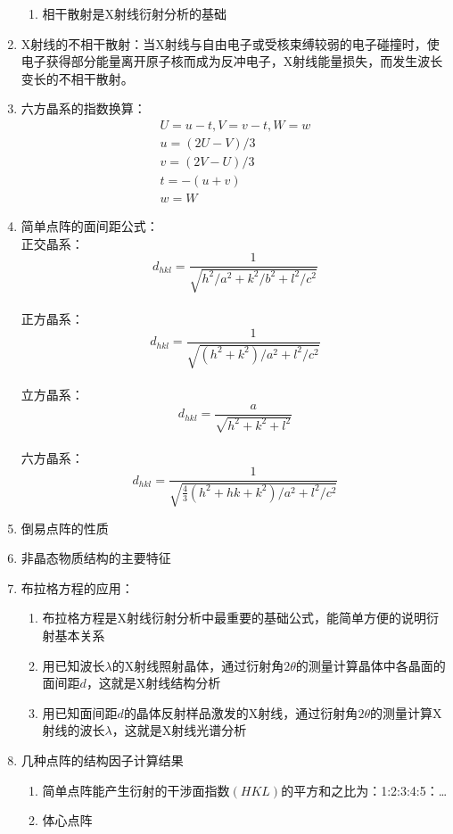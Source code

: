 \documentclass[12pt,a4paper]{article}
\begin{document}
\begin{enumerate}
\begin{enumerate}
            \item 相干散射是X射线衍射分析的基础
        \end{enumerate}
        \item X射线的不相干散射：当X射线与自由电子或受核束缚较弱的电子碰撞时，使电子获得部分能量离开原子核而成为反冲电子，X射线能量损失，而发生波长变长的不相干散射。
        \item 六方晶系的指数换算：$$\begin{array}{c}{U=u-t, V=v-t, W=w} \\ {u=(2 U-V) / 3} \\ {v=(2 V-U) / 3} \\ {t=-(u+v)} \\ {w=W}\end{array}$$
        \item 简单点阵的面间距公式：
        \\正交晶系：$$d_{h k l}=\frac{1}{\sqrt{h^{2} / a^{2}+k^{2} / b^{2}+l^{2} / c^{2}}}$$
        \\正方晶系：$$d_{h k l}=\frac{1}{\sqrt{\left(h^{2}+k^{2}\right) / a^{2}+l^{2} / c^{2}}}$$
        \\立方晶系：$$d_{h k l}=\frac{a}{\sqrt{h^{2}+k^{2}+l^{2}}}$$
        \\六方晶系：$$d_{h k l}=\frac{1}{\sqrt{\frac{4}{3}\left(h^{2}+h k+k^{2}\right) / a^{2}+l^{2} / c^{2}}}$$
        \item 倒易点阵的性质
        \item 非晶态物质结构的主要特征
        \item 布拉格方程的应用：
        \begin{enumerate}
            \item 布拉格方程是X射线衍射分析中最重要的基础公式，能简单方便的说明衍射基本关系
            \item 用已知波长$\lambda$的X射线照射晶体，通过衍射角$2\theta$的测量计算晶体中各晶面的面间距$d$，这就是X射线结构分析
            \item 用已知面间距$d$的晶体反射样品激发的X射线，通过衍射角$2\theta$的测量计算X射线的波长$\lambda$，这就是X射线光谱分析 
        \end{enumerate}
        \item 几种点阵的结构因子计算结果
        \begin{enumerate}
            \item 简单点阵能产生衍射的干涉面指数$(HKL)$的平方和之比为：1:2:3:4:5：\dots
            \item 体心点阵
            \begin{enumerate}

\end{enumerate}
\end{enumerate}
\end{enumerate}
\end{document}

